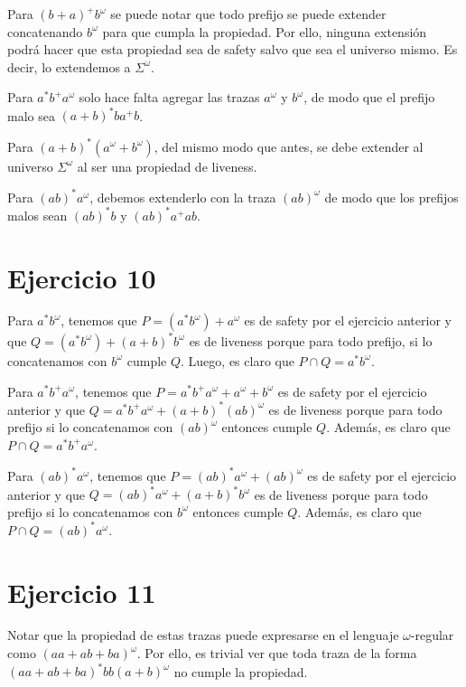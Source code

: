 \documentclass{article}
\begin{document}
Para $(b+a)^+b^\omega$ se puede notar que todo prefijo se puede extender concatenando $b^\omega$ para que cumpla la propiedad.
Por ello, ninguna extensión podrá hacer que esta propiedad sea de safety salvo que sea el universo mismo.
Es decir, lo extendemos a $\Sigma^\omega$.

Para $a^*b^+a^\omega$ solo hace falta agregar las trazas $a^\omega$ y $b^\omega$, de modo que el prefijo malo sea $(a+b)^*ba^+b$.

Para $(a+b)^*(a^\omega+b^\omega)$, del mismo modo que antes, se debe extender al universo $\Sigma^\omega$ al ser una propiedad de liveness.

Para $(ab)^*a^\omega$, debemos extenderlo con la traza $(ab)^\omega$ de modo que los prefijos malos sean $(ab)^*b$ y $(ab)^*a^+ab$.

\section*{Ejercicio 10}
Para $a^*b^\omega$, tenemos que $P = (a^*b^\omega)+a^\omega$ es de safety por el ejercicio anterior y que $Q = (a^*b^\omega) + (a + b)^*b^\omega$ es de liveness porque para todo prefijo, si lo concatenamos con $b^\omega$ cumple $Q$.
Luego, es claro que $P \cap Q = a^*b^\omega$.

Para $a^*b^+a^\omega$, tenemos que $P = a^*b^+a^\omega + a^\omega + b^\omega$ es de safety por el ejercicio anterior y que $Q = a^*b^+a^\omega + (a + b)^*(ab)^\omega$ es de liveness porque para todo prefijo si lo concatenamos con $(ab)^\omega$ entonces cumple $Q$.
Además, es claro que $P \cap Q = a^*b^+a^\omega$.

Para $(ab)^*a^\omega$, tenemos que $P = (ab)^*a^\omega + (ab)^\omega$ es de safety por el ejercicio anterior y que $Q = (ab)^*a^\omega + (a + b)^*b^\omega$ es de liveness porque para todo prefijo si lo concatenamos con $b^\omega$ entonces cumple $Q$.
Además, es claro que $P \cap Q = (ab)^*a^\omega$.

\section*{Ejercicio 11}
Notar que la propiedad de estas trazas puede expresarse en el lenguaje $\omega$-regular como $(aa + ab + ba)^\omega$.
Por ello, es trivial ver que toda traza de la forma $(aa + ab + ba)^*bb(a + b)^\omega$ no cumple la propiedad.
\end{document}
